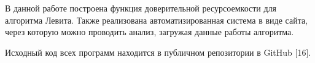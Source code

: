 
В данной работе построена функция доверительной ресурсоемкости для алгоритма Левита. Также реализована автоматизированная система в виде сайта, через которую можно проводить анализ, загружая данные работы алгоритма.
\par
Исходный код всех программ находится в публичном репозитории в GitHub [16].

\pagebreak